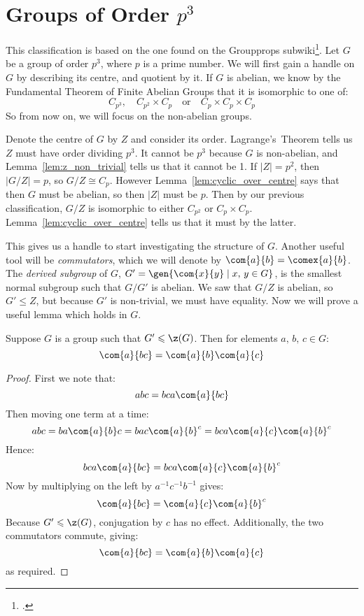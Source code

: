 \section{Groups of Order \(p^3\)}
This classification is based on the one found on the Groupprops subwiki\footcite{pcubed}.
Let \(G\) be a group of order \(p^3\), where \(p\) is a prime number.
We will first gain a handle on \(G\) by describing its centre, and quotient by it.
If \(G\) is abelian, we know by the Fundamental Theorem of Finite Abelian Groups that it is isomorphic to one of:
\[ C_{p^3}, \quad C_{p^2} \times C_p \quad \text{or} \quad C_p \times C_p \times C_p\]
So from now on, we will focus on the non-abelian groups.

Denote the centre of \(G\) by \(Z\) and consider its order.
Lagrange's~Theorem tells us \(Z\) must have order dividing \(p^3\).
It cannot be \(p^3\) because \(G\) is non-abelian, and Lemma~\ref{lem:z_non_trivial} tells us that it cannot be 1.
If \(|Z| = p^2\), then \(|G/Z| = p\), so \(G/Z \cong C_p\).
However Lemma~\ref{lem:cyclic_over_centre} says that then \(G\) must be abelian, so then \(|Z|\) must be \(p\).
Then by our previous classification, \(G/Z\) is isomorphic to either \(C_{p^2}\) or \(C_p \times C_p\).
Lemma~\ref{lem:cyclic_over_centre} tells us that it must by the latter.

This gives us a handle to start investigating the structure of \(G\).
Another useful tool will be \emph{commutators}, which we will denote by \(\com{a}{b} = \comex{a}{b}\).
The \emph{derived subgroup} of \(G\), \(G' = \gen{\com{x}{y} \mid x,\,y \in G}\), is the smallest normal
subgroup such that \(G/G'\) is abelian.
We saw that \(G/Z\) is abelian, so \(G' \leqslant Z\), but because \(G'\) is non-trivial, we must have equality.
Now we will prove a useful lemma which holds in \(G\).

\begin{lemma}
    Suppose \(G\) is a group such that \(G' \leqslant \z(G)\).
    Then for elements \(a,\,b,\,c \in G\):
    \[\com{a}{bc} = \com{a}{b}\com{a}{c}\]
\end{lemma}

\begin{proof}
    First we note that:
    \[abc = bca\com{a}{bc}\]
    Then moving one term at a time:
    \[abc = ba\com{a}{b}c = bac\com{a}{b}^c = bca\com{a}{c}\com{a}{b}^c\]
    Hence:
    \[bca\com{a}{bc} = bca\com{a}{c}\com{a}{b}^c\]
    Now by multiplying on the left by \(a^{-1}c^{-1}b^{-1}\) gives:
    \[\com{a}{bc} = \com{a}{c}\com{a}{b}^c\]
    Because \(G' \leqslant \z(G)\), conjugation by \(c\) has no effect.
    Additionally, the two commutators commute, giving:
    \[\com{a}{bc} = \com{a}{b}\com{a}{c}\]
    as required.
\end{proof}

